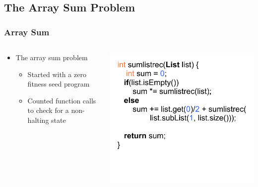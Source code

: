 \documentclass{beamer}
\begin{document}
\subsection[The Array Sum Problem]{The Array Sum Problem}

\begin{frame}
\frametitle{Array Sum}
\begin{columns}[T]
\begin{column}{0.5\textwidth}
\begin{itemize}
\item The array sum problem
\\
\begin{itemize}
\item Started with a zero fitness seed program
\item Counted function calls to check for a non-halting state
\end{itemize}

\end{itemize}
\end{column}
\begin{column}{0.5\textwidth}
\includegraphics[height=.65\textheight]{Illustrations/seedRec.pdf}
\end{column}
\end{columns}
\end{frame}
\end{document}
